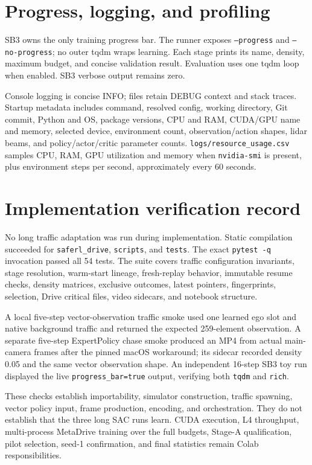 \documentclass[10pt,twocolumn]{article}
\begin{document}
\section{Progress, logging, and profiling}
SB3 owns the only training progress bar. The runner exposes \texttt{--progress} and
\texttt{--no-progress}; no outer tqdm wraps learning. Each stage prints its name, density,
maximum budget, and concise validation result. Evaluation uses one tqdm loop when enabled.
SB3 verbose output remains zero.

Console logging is concise INFO; files retain DEBUG context and stack traces. Startup
metadata includes command, resolved config, working directory, Git commit, Python and OS,
package versions, CPU and RAM, CUDA/GPU name and memory, selected device, environment
count, observation/action shapes, lidar beams, and policy/actor/critic parameter counts.
\texttt{logs/resource\_usage.csv} samples CPU, RAM, GPU utilization and memory when
\texttt{nvidia-smi} is present, plus environment steps per second, approximately every
60 seconds.

\section{Implementation verification record}
No long traffic adaptation was run during implementation. Static compilation succeeded
for \texttt{saferl\_drive}, \texttt{scripts}, and \texttt{tests}. The exact
\texttt{pytest -q} invocation passed all 54 tests. The suite covers traffic configuration
invariants, stage resolution, warm-start lineage, fresh-replay behavior, immutable resume
checks, density matrices, exclusive outcomes, latest pointers, fingerprints, selection,
Drive critical files, video sidecars, and notebook structure.

A local five-step vector-observation traffic smoke used one learned ego slot and native
background traffic and returned the expected 259-element observation. A separate
five-step ExpertPolicy chase smoke produced an MP4 from actual main-camera frames after
the pinned macOS workaround; its sidecar recorded density 0.05 and the same vector
observation shape. An independent 16-step SB3 toy run displayed the live
\texttt{progress\_bar=true} output, verifying both \texttt{tqdm} and \texttt{rich}.

These checks establish importability, simulator construction, traffic spawning, vector
policy input, frame production, encoding, and orchestration. They do not establish that
the three long SAC runs learn. CUDA execution, L4 throughput, multi-process MetaDrive
training over the full budgets, Stage-A qualification, pilot selection, seed-1
confirmation, and final statistics remain Colab responsibilities.
\end{document}
